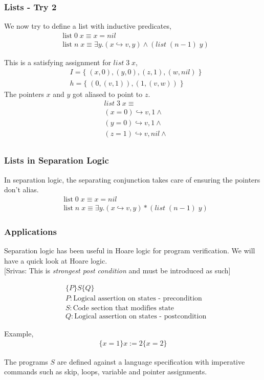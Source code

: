 \documentclass{beamer}
\newcommand{\mscmt}[1]{{\color{blue} [Srivas: {#1}]}}
\begin{document}
\begin{frame}
\frametitle{Lists - Try 2}
We now try to define a list with inductive predicates,
\begin{align*}
    & \textrm{list} \; 0 \; x \equiv x = nil
    \\
    & \textrm{list} \; n \; x \equiv \exists y. (x \hookrightarrow v,y) \land (list \; (n-1) \; y)
\end{align*}

This is a satisfying assignment for $list \; 3 \; x$,
\begin{align*}
    & I = 
    \{\; (x,0), (y,0), (z,1) , (w,nil) \;\}
    \\
    & h = 
    \{\; (0, (v,1)) , (1, (v,w)) \;\}
\end{align*}
The pointers $x$ and $y$ got aliased to point to $z$.
\begin{align*}
    & list \; 3 \; x \equiv \\
    & (x = 0) \hookrightarrow v,1 \land \\
    & (y = 0) \hookrightarrow v,1 \land \\
    & (z = 1) \hookrightarrow v,nil \land \\
\end{align*}
\end{frame}

\begin{frame}
\frametitle{Lists in Separation Logic}
In separation logic, the separating conjunction takes care of ensuring
the pointers don't alias.
\begin{align*}
    & \textrm{list} \; 0 \; x \equiv x = nil
    \\
    & \textrm{list} \; n \; x \equiv \exists y. (x \hookrightarrow v,y) * (list \; (n-1) \; y)
\end{align*}
\end{frame}

\begin{frame}
\frametitle{Applications}
Separation logic has been useful in Hoare logic for program verification. We will
have a quick look at Hoare logic. \\
\mscmt{\tiny{This is \emph{strongest post condition} and must be introduced as such}}

\begin{align*}
    & \{P\}S\{Q\} \\
    & P : \textrm{Logical assertion on states - precondition} \\
    & S : \textrm{Code section that modifies state} \\
    & Q : \textrm{Logical assertion on states - postcondition}
\end{align*}

Example,
\begin{align*}
    \{x = 1\}x := 2\{x = 2\}
\end{align*}

The programs $S$ are defined against a language specification with 
imperative commands such as skip, loops,
variable and pointer assignments.
\end{frame}
\end{document}
